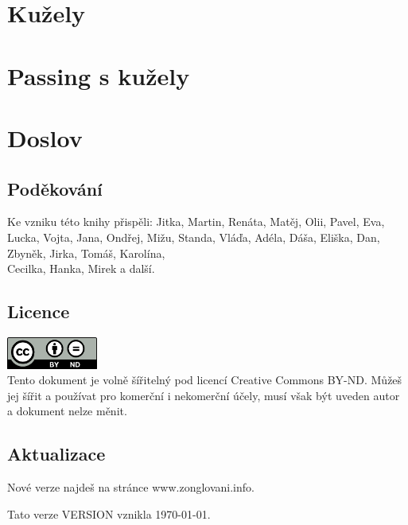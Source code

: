 \documentclass[14pt,a5paper,twoside]{book}
\begin{document}


\chapter{Kužely}



\chapter{Passing s kužely}



\chapter{Doslov}
\section{Poděkování}
Ke vzniku této knihy přispěli: Jitka, Martin, Renáta, Matěj, Olii, Pavel, Eva, Lucka, Vojta, Jana, Ondřej, Mižu, Standa, Vláďa, Adéla, Dáša, Eliška, Dan, Zbyněk, Jirka, Tomáš, Karolína,\\Cecilka, Hanka, Mirek a další.
\section{Licence}
\includegraphics[width=3cm]{obrazky/cc-by-nd.png}\\
Tento dokument je volně šířitelný pod licencí Creative Commons BY-ND.
Můžeš jej šířit a používat pro komerční i nekomerční účely, musí však být uveden autor a dokument nelze měnit.
\section{Aktualizace}
Nové verze najdeš na stránce www.zonglovani.info.

Tato verze VERSION vznikla \today.
\end{document}
